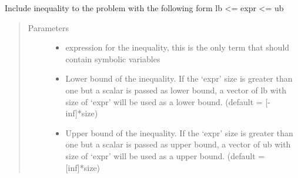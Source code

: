 \documentclass[letterpaper,10pt,english]{sphinxmanual}
\begin{document}
\begin{fulllineitems}
\begin{fulllineitems}
\begin{quote}
\begin{description}
\begin{itemize}
\end{itemize}

\end{description}\end{quote}

\end{fulllineitems}


\begin{fulllineitems}
\label{\detokenize{yaocptool.optimization:yaocptool.optimization.abstract_optimization_problem.AbstractOptimizationProblem.include_inequality}}
Include inequality to the problem with the following form
lb \textless{}= expr \textless{}= ub
\begin{quote}\begin{description}
\item[{Parameters}] \leavevmode\begin{itemize}
\item {} 
 \textendash{} expression for the inequality, this is the only term that should contain symbolic variables

\item {} 
 \textendash{} Lower bound of the inequality. If the ‘expr’ size is greater than one but a scalar is passed as
lower bound, a vector of lb with size of ‘expr’ will be used as a lower bound. (default = {[}-inf{]}*size)

\item {} 
 \textendash{} Upper bound of the inequality. If the  ‘expr’ size is greater than one but a scalar is passed as
upper bound, a vector of ub with size of  ‘expr’ will be used as a upper bound. (default = {[}inf{]}*size)

\end{itemize}

\end{description}\end{quote}

\end{fulllineitems}



\end{fulllineitems}
\end{document}
